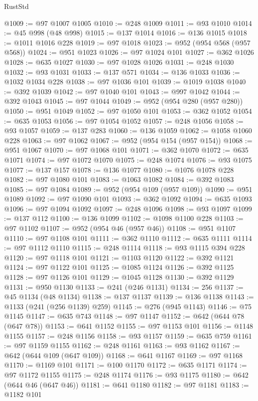 \begin{lexlean}{RustStd}
\begin{coremodule}
@1009 := @97 @1007 @1005
@1010 := @248 @1009
@1011 := @93 @1010
@1014 := @45 @998 (@48 @998)
@1015 := @137 @1014
@1016 := @136 @1015
@1018 := @1011 @1016 @228
@1019 := @97 @1018
@1023 := @952 (@954 @568 (@957 @568))
@1024 := @951 @1023
@1026 := @97 @1024 @101
@1027 := @362 @1026
@1028 := @635 @1027
@1030 := @97 @1028 @1026
@1031 := @248 @1030
@1032 := @93 @1031
@1033 := @137 @571
@1034 := @136 @1033
@1036 := @1032 @1034 @228
@1038 := @97 @1036 @101
@1039 := @1019 @1038
@1040 := @392 @1039
@1042 := @97 @1040 @101
@1043 := @997 @1042
@1044 := @392 @1043
@1045 := @97 @1044
@1049 := @952 (@954 @280 (@957 @280))
@1050 := @951 @1049
@1052 := @97 @1050 @101
@1053 := @362 @1052
@1054 := @635 @1053
@1056 := @97 @1054 @1052
@1057 := @248 @1056
@1058 := @93 @1057
@1059 := @137 @283
@1060 := @136 @1059
@1062 := @1058 @1060 @228
@1063 := @97 @1062
@1067 := @952 (@954 @154 (@957 @154))
@1068 := @951 @1067
@1070 := @97 @1068 @101
@1071 := @362 @1070
@1072 := @635 @1071
@1074 := @97 @1072 @1070
@1075 := @248 @1074
@1076 := @93 @1075
@1077 := @137 @157
@1078 := @136 @1077
@1080 := @1076 @1078 @228
@1082 := @97 @1080 @101
@1083 := @1063 @1082
@1084 := @392 @1083
@1085 := @97 @1084
@1089 := @952 (@954 @109 (@957 @109))
@1090 := @951 @1089
@1092 := @97 @1090 @101
@1093 := @362 @1092
@1094 := @635 @1093
@1096 := @97 @1094 @1092
@1097 := @248 @1096
@1098 := @93 @1097
@1099 := @137 @112
@1100 := @136 @1099
@1102 := @1098 @1100 @228
@1103 := @97 @1102
@1107 := @952 (@954 @46 (@957 @46))
@1108 := @951 @1107
@1110 := @97 @1108 @101
@1111 := @362 @1110
@1112 := @635 @1111
@1114 := @97 @1112 @1110
@1115 := @248 @1114
@1118 := @93 @1115 @394 @228
@1120 := @97 @1118 @101
@1121 := @1103 @1120
@1122 := @392 @1121
@1124 := @97 @1122 @101
@1125 := @1085 @1124
@1126 := @392 @1125
@1128 := @97 @1126 @101
@1129 := @1045 @1128
@1130 := @392 @1129
@1131 := @950 @1130
@1133 := @241 (@246 @1131)
@1134 := 256
@1137 := @45 @1134 (@48 @1134)
@1138 := @137 @1137
@1139 := @136 @1138
@1143 := @1133 (@241 (@256 @1139) @259)
@1145 := @276 (@945 @1143)
@1146 := @75 @1145
@1147 := @635 @743
@1148 := @97 @1147
@1152 := @642 (@644 @78 (@647 @78))
@1153 := @641 @1152
@1155 := @97 @1153 @101
@1156 := @1148 @1155
@1157 := @248 @1156
@1158 := @93 @1157
@1159 := @635 @759
@1161 := @97 @1159 @1155
@1162 := @248 @1161
@1163 := @93 @1162
@1167 := @642 (@644 @109 (@647 @109))
@1168 := @641 @1167
@1169 := @97 @1168
@1170 := @1169 @101
@1171 := @100 @1170
@1172 := @635 @1171
@1174 := @97 @1172 @1155
@1175 := @248 @1174
@1176 := @93 @1175
@1180 := @642 (@644 @46 (@647 @46))
@1181 := @641 @1180
@1182 := @97 @1181
@1183 := @1182 @101

\end{coremodule}
\end{lexlean}

